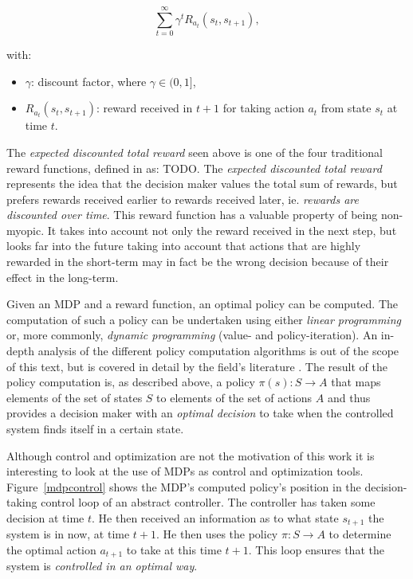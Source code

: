 \[
\sum_{t=0}^{\infty} {\gamma}^{t}R_{a_t}(s_t,s_{t+1}),
\]

with:
\begin{itemize}
\item $\gamma$: discount factor, where $\gamma\in(0,1]$,
\item $R_{a_t}(s_t,s_{t+1})$: reward received in $t+1$ for taking action $a_t$ from state $s_t$ at time $t$.	
\end{itemize}

The \textit{expected discounted total reward} seen above is one of the four traditional reward functions, defined in \cite{puterman} as: TODO. The \textit{expected discounted total reward} represents the idea that the decision maker values the total sum of rewards, but prefers rewards received earlier to rewards received later, ie. \textit{rewards are discounted over time}. This reward function has a valuable property of being non-myopic. It takes into account not only the reward received in the next step, but looks far into the future taking into account that actions that are highly rewarded in the short-term may in fact be the wrong decision because of their effect in the long-term. 

Given an MDP and a reward function, an optimal policy can be computed. The computation of such a policy can be undertaken using either \textit{linear programming} or, more commonly, \textit{dynamic programming} (value- and policy-iteration). An in-depth analysis of the different policy computation algorithms is out of the scope of this text, but is covered in detail by the field's literature \cite{puterman}. The result of the policy computation is, as described above, a policy $\pi(s): S \rightarrow A$ that maps elements of the set of states $S$ to elements of the set of actions $A$ and thus provides a decision maker with an \textit{optimal decision} to take when the controlled system finds itself in a certain state.

Although control and optimization are not the motivation of this work it is interesting to look at the use of MDPs as control and optimization tools. Figure~\ref{mdpcontrol} shows the MDP's computed policy's position in the decision-taking control loop of an abstract controller. The controller has taken some decision at time $t$. He then received an information as to what state $s_{t+1}$ the system is in now, at time $t+1$. He then uses the policy $\pi: S \rightarrow A$ to determine the optimal action $a_{t+1}$ to take at this time $t+1$. This loop ensures that the system is \textit{controlled in an optimal way}.

